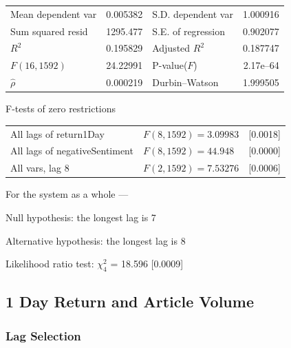 \begin{center}
\begin{tabular}{lrlr}
Mean dependent var &  0.005382 & S.D. dependent var &  1.000916 \\
Sum squared resid &  1295.477 & S.E. of regression &  0.902077 \\
$R^2$ &  0.195829 & Adjusted $R^2$ &  0.187747 \\
$F(16, 1592)$ &  24.22991 & P-value($F$) &  2.17\textrm{e--64} \\
$\hat{\rho}$ &  0.000219 & Durbin--Watson &  1.999505 \\
\end{tabular}

\end{center}

\begin{center}
F-tests of zero restrictions\\[1em]
\begin{tabular}{lll}
All lags of return1Day & $F(8, 1592) = 3.09983$ & [0.0018]\\
All lags of negativeSentiment & $F(8, 1592) = 44.948$ & [0.0000]\\
All vars, lag 8 & $F(2, 1592) = 7.53276$ & [0.0006]\\
\end{tabular}
\end{center}

\noindent For the system as a whole ---\par
Null hypothesis: the longest lag is 7\par
Alternative hypothesis: the longest lag is 8\par
Likelihood ratio test: $\chi^2_{4}$ = 18.596 [0.0009]\par    

\subsection{1 Day Return and Article Volume}

\subsubsection{Lag Selection}

